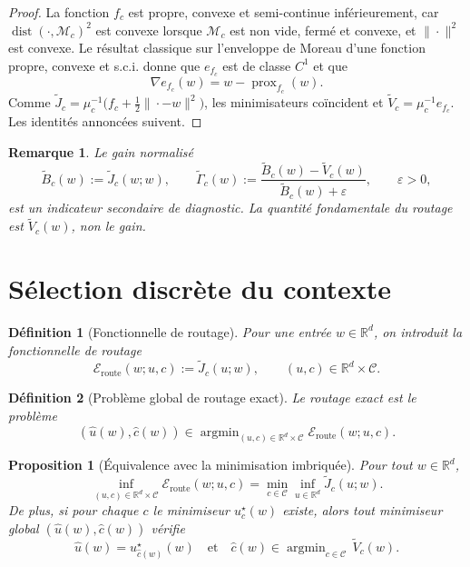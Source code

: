 \documentclass[11pt,a4paper]{article}
\newtheorem{definition}{Définition}[section]
\newtheorem{proposition}{Proposition}[section]
\newtheorem{remark}{Remarque}[section]
\DeclareMathOperator{\prox}{prox}
\DeclareMathOperator{\argmin}{argmin}
\DeclareMathOperator{\dist}{dist}
\newcommand{\R}{\mathbb R}
\newcommand{\Mcal}{\mathcal M}
\newcommand{\Ccal}{\mathcal C}
\begin{document}
\begin{proof}
La fonction \(f_c\) est propre, convexe et semi-continue inférieurement, car \(\dist(\cdot,\Mcal_c)^2\) est convexe lorsque \(\Mcal_c\) est non vide, fermé et convexe, et \(\|\cdot\|^2\) est convexe. Le résultat classique sur l'enveloppe de Moreau d'une fonction propre, convexe et s.c.i. donne que \(e_{f_c}\) est de classe \(C^1\) et que
\[
\nabla e_{f_c}(w)=w-\prox_{f_c}(w).
\]
Comme \(\widetilde J_c=\mu_c^{-1}\bigl(f_c+\frac12\|\cdot-w\|^2\bigr)\), les minimisateurs coïncident et \(\widetilde V_c=\mu_c^{-1}e_{f_c}\). Les identités annoncées suivent.
\end{proof}

\begin{remark}
Le gain normalisé
\[
\widetilde B_c(w):=\widetilde J_c(w;w),
\qquad
\widetilde\Gamma_c(w):=\frac{\widetilde B_c(w)-\widetilde V_c(w)}{\widetilde B_c(w)+\varepsilon},
\qquad \varepsilon>0,
\]
est un indicateur secondaire de diagnostic. La quantité fondamentale du routage est \(\widetilde V_c(w)\), non le gain.
\end{remark}

\section{Sélection discrète du contexte}

\begin{definition}[Fonctionnelle de routage]
Pour une entrée \(w\in\R^d\), on introduit la fonctionnelle de routage
\[
\mathcal E_{\mathrm{route}}(w;u,c):=\widetilde J_c(u;w),
\qquad
(u,c)\in \R^d\times\Ccal.
\]
\end{definition}

\begin{definition}[Problème global de routage exact]
Le routage exact est le problème
\[
(\hat u(w),\hat c(w))
\in
\argmin_{(u,c)\in \R^d\times\Ccal}\mathcal E_{\mathrm{route}}(w;u,c).
\]
\end{definition}

\begin{proposition}[Équivalence avec la minimisation imbriquée]
Pour tout \(w\in\R^d\),
\[
\inf_{(u,c)\in \R^d\times\Ccal}\mathcal E_{\mathrm{route}}(w;u,c)
=
\min_{c\in\Ccal}\inf_{u\in\R^d}\widetilde J_c(u;w).
\]
De plus, si pour chaque \(c\) le minimiseur \(u_c^\star(w)\) existe, alors tout minimiseur global \((\hat u(w),\hat c(w))\) vérifie
\[
\hat u(w)=u_{\hat c(w)}^\star(w)
\quad\text{et}\quad
\hat c(w)\in\argmin_{c\in\Ccal}\,\widetilde V_c(w).
\]
\end{proposition}
\end{document}
